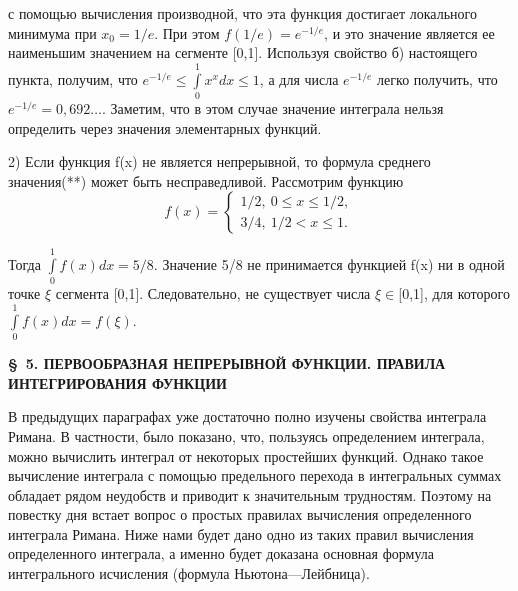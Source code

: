 \documentclass[a4paper,12pt]{article}
\begin{document}
\thispagestyle{fancy}
\fancyhf{}

\noindent с помощью вычисления производной, что эта функция достигает локального минимума при $x_{0}=1/e$. При этом $f(1/e)=e^{-1/e}$, и это значение является ее наименьшим значением на сегменте [0,1]. Используя свойство б) настоящего пункта, получим, что $e^{-1/e}\leqslant\int\limits_{0}^{1}x^{x}dx\leqslant1$, а для числа $e^{-1/e}$ легко получить, что $e^{-1/e}=0,692\dots$. Заметим, что в этом случае значение интеграла нельзя определить через значения элементарных функций.

2) Если функция f(x) не является непрерывной, то формула среднего значения(**) может быть несправедливой. Рассмотрим функцию
\begin{equation*}
	f(x) = 
	\begin{cases}
		1/2, \ 0\leqslant x \leqslant 1/2, \\
		3/4, \ 1/2 < x \leqslant 1.
	\end{cases}
\end{equation*}

\noindent Тогда $\int\limits_{0}^{1}f(x)dx=5/8$. Значение 5/8 не принимается функцией f(x) ни в одной точке $\xi$ сегмента [0,1]. Следовательно, не существует числа $\xi\in$[0,1], для которого $\int\limits_{0}^{1}f(x)dx=f(\xi)$.

\begin{center}
\textbf{\S~5. ПЕРВООБРАЗНАЯ НЕПРЕРЫВНОЙ ФУНКЦИИ. ПРАВИЛА ИНТЕГРИРОВАНИЯ ФУНКЦИИ}
\end{center}

В предыдущих параграфах уже достаточно полно изучены свойства интеграла Римана. В частности, было показано, что, пользуясь определением интеграла, можно вычислить интеграл от некоторых простейших функций. Однако такое вычисление интеграла с помощью предельного перехода в интегральных суммах обладает рядом неудобств и приводит к значительным трудностям. Поэтому на повестку дня встает вопрос о простых правилах вычисления определенного интеграла Римана. Ниже нами будет дано одно из таких правил вычисления определенного интеграла, а именно будет доказана основная формула интегрального исчисления (формула Ньютона---Лейбница).
\end{document}
